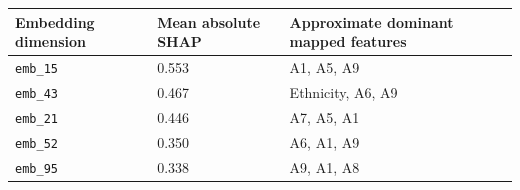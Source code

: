 \begin{tabular}{lll}
\toprule
Embedding dimension & Mean absolute SHAP & Approximate dominant mapped features \\
\midrule
\texttt{emb\_15} & 0.553 & A1, A5, A9 \\
\texttt{emb\_43} & 0.467 & Ethnicity, A6, A9 \\
\texttt{emb\_21} & 0.446 & A7, A5, A1 \\
\texttt{emb\_52} & 0.350 & A6, A1, A9 \\
\texttt{emb\_95} & 0.338 & A9, A1, A8 \\
\bottomrule
\end{tabular}
